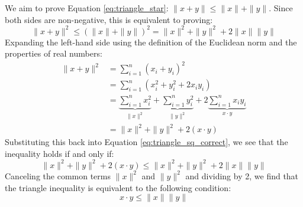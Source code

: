 \begin{math-stroke}
We aim to prove Equation \ref{eq:triangle_star}: $\|x + y\| \le \|x\| + \|y\|$. Since both sides are non-negative, this is equivalent to proving:
\begin{equation} \label{eq:triangle_sq_correct}
\|x + y\|^2 \le (\|x\| + \|y\|)^2 = \|x\|^2 + \|y\|^2 + 2\|x\|\|y\|
\end{equation}
Expanding the left-hand side using the definition of the Euclidean norm and the properties of real numbers:
\begin{align*}
\|x + y\|^2 &= \sum_{i=1}^n (x_i + y_i)^2 \\
&= \sum_{i=1}^n (x_i^2 + y_i^2 + 2x_i y_i) \\
&= \underbrace{\sum_{i=1}^n x_i^2}_{\|x\|^2} + \underbrace{\sum_{i=1}^n y_i^2}_{\|y\|^2} + 2\underbrace{\sum_{i=1}^n x_i y_i}_{x \cdot y} \\
&= \|x\|^2 + \|y\|^2 + 2(x \cdot y)
\end{align*}
Substituting this back into Equation \ref{eq:triangle_sq_correct}, we see that the inequality holds if and only if:
\[
\|x\|^2 + \|y\|^2 + 2(x \cdot y) \le \|x\|^2 + \|y\|^2 + 2\|x\|\|y\|
\]
Canceling the common terms $\|x\|^2$ and $\|y\|^2$ and dividing by 2, we find that the triangle inequality is equivalent to the following condition:
\begin{equation} \label{eq:cs_goal}
x \cdot y \le \|x\|\|y\|
\end{equation}
\end{math-stroke}

